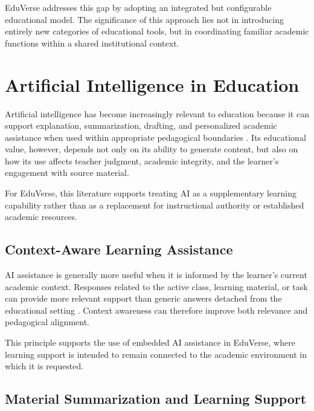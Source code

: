 EduVerse addresses this gap by adopting an integrated but configurable
educational model. The significance of this approach lies not in introducing
entirely new categories of educational tools, but in coordinating familiar
academic functions within a shared institutional context.

\section{Artificial Intelligence in Education}
\label{sec:artificial_intelligence_in_education}

Artificial intelligence has become increasingly relevant to education because
it can support explanation, summarization, drafting, and personalized academic
assistance when used within appropriate pedagogical boundaries
\cite{bond2024ai,labadze2023chatbots}. Its educational value, however, depends
not only on its ability to generate content, but also on how its use affects
teacher judgment, academic integrity, and the learner's engagement with source
material.

For EduVerse, this literature supports treating AI as a supplementary learning
capability rather than as a replacement for instructional authority or
established academic resources.

\subsection{Context-Aware Learning Assistance}
\label{subsec:context_aware_learning_assistance}

AI assistance is generally more useful when it is informed by the learner's
current academic context. Responses related to the active class, learning
material, or task can provide more relevant support than generic answers
detached from the educational setting
\cite{alsafari2024teaching,labadze2023chatbots}. Context awareness can therefore
improve both relevance and pedagogical alignment.

This principle supports the use of embedded AI assistance in EduVerse, where
learning support is intended to remain connected to the academic environment in
which it is requested.

\subsection{Material Summarization and Learning Support}
\label{subsec:material_summarization_and_learning_support}

